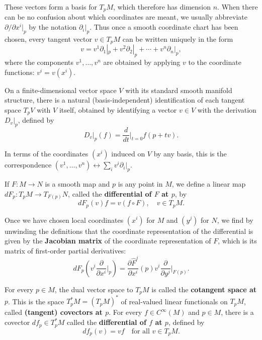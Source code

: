 These vectors form a basis for $T_p M$, which therefore has dimension $n$. When there can be no confusion about which coordinates are meant, we usually abbreviate $\partial/\partial x^i|_p$ by the notation $\partial_i|_p$. Thus once a smooth coordinate chart has been chosen, every tangent vector $v \in T_p M$ can be written uniquely in the form
\begin{equation}
v = v^1 \partial_1|_p + v^2 \partial_2|_p + \cdots + v^n \partial_n|_p,
\tag{A.3}
\end{equation}
where the components $v^1, \ldots, v^n$ are obtained by applying $v$ to the coordinate functions: $v^i = v(x^i)$.

On a finite-dimensional vector space $V$ with its standard smooth manifold structure, there is a natural (basis-independent) identification of each tangent space $T_p V$ with $V$ itself, obtained by identifying a vector $v \in V$ with the derivation $D_v|_p$, defined by
\begin{equation}
D_v|_p(f) = \frac{d}{dt}\bigg|_{t=0} f(p + tv).
\end{equation}

In terms of the coordinates $(x^i)$ induced on $V$ by any basis, this is the correspondence $(v^1, \ldots, v^n) \leftrightarrow \sum_i v^i \partial_i|_p$.

If $F: M \to N$ is a smooth map and $p$ is any point in $M$, we define a linear map $dF_p: T_p M \to T_{F(p)} N$, called the \textbf{differential of $F$ at $p$}, by
\begin{equation}
dF_p(v)f = v(f \circ F), \quad v \in T_p M.
\end{equation}

Once we have chosen local coordinates $(x^i)$ for $M$ and $(y^j)$ for $N$, we find by unwinding the definitions that the coordinate representation of the differential is given by the \textbf{Jacobian matrix} of the coordinate representation of $F$, which is its matrix of first-order partial derivatives:
\begin{equation}
dF_p\left(v^i \frac{\partial}{\partial x^i}\bigg|_p\right) = \frac{\partial \hat{F}^j}{\partial x^i}(p) v^i \frac{\partial}{\partial y^j}\bigg|_{F(p)}.
\end{equation}

For every $p \in M$, the dual vector space to $T_p M$ is called the \textbf{cotangent space at $p$}. This is the space $T_p^* M = (T_p M)^*$ of real-valued linear functionals on $T_p M$, called \textbf{(tangent) covectors at $p$}. For every $f \in C^\infty(M)$ and $p \in M$, there is a covector $df_p \in T_p^* M$ called the \textbf{differential of $f$ at $p$}, defined by
\begin{equation}
df_p(v) = vf \quad \text{for all } v \in T_p M.
\tag{A.4}
\end{equation}

